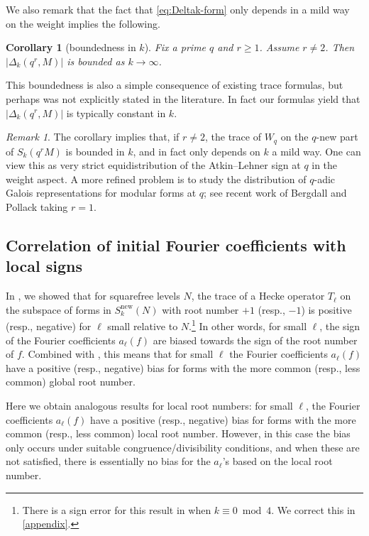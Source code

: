 \documentclass[11pt]{amsart}
\newcommand{\new}{\mathrm{new}}
\renewcommand{\mod}{\bmod}
\numberwithin{lem}{section}
\newtheorem{cor}[lem]{Corollary}
\theoremstyle{remark}
\newtheorem{rem}[lem]{Remark}
\theoremstyle{definition}
\numberwithin{equation}{section}
\begin{document}
We also remark that the fact that \eqref{eq:Deltak-form} only depends in a mild way on the weight implies the following.

\begin{cor} [boundedness in $k$] Fix a prime $q$ and $r \ge 1$.  Assume $r \ne 2$.  Then $\lvert \Delta_k(q^r, M) \rvert$ is bounded as $k \to \infty$.
\end{cor}

This boundedness is also a simple consequence of existing trace formulas, but perhaps was not explicitly stated in the literature.  In fact our formulas yield that $\lvert \Delta_k(q^r, M) \rvert$ is typically constant in $k$.

\begin{rem} The corollary implies that, if $r \ne 2$, the trace of $W_q$ on the $q$-new part of $S_k(q^r M)$ is bounded in $k$, and in fact only depends on $k$ a mild way.  One can view this as very strict equidistribution of the Atkin--Lehner sign at $q$ in the weight aspect.  A more refined problem is to study the distribution of $q$-adic Galois representations for modular forms at $q$; see recent work of Bergdall and Pollack \cite{BP} taking $r=1$. 
\end{rem}

\subsection{Correlation of initial Fourier coefficients with local signs}

In \cite{me:pharis}, we showed that for squarefree levels $N$, the trace of a Hecke operator $T_\ell$ on the subspace of forms in $S_k^\new(N)$ with root number $+1$ (resp., $-1$) is positive (resp., negative) for $\ell$ small relative to $N$.\footnote{There is a sign error for this result in \cite{me:pharis} when $k \equiv 0 \mod 4$.  We correct this in \cref{appendix}.} In other words, for small $\ell$, the sign of the Fourier coefficients $a_\ell(f)$ are biased towards the sign of the root number of $f$.  Combined with \cite{me:refdim}, this means that for small $\ell$ the Fourier coefficients $a_\ell(f)$ have a positive (resp., negative) bias for forms with the more common (resp., less common) global root number.

Here we obtain analogous results for local root numbers: for small $\ell$, the
Fourier coefficients $a_\ell(f)$ have a positive (resp., negative) bias for forms with the more common (resp., less common) local root number.  However, in this case the bias only occurs under suitable congruence/divisibility conditions, and when these are not satisfied, there is essentially no bias for the $a_\ell$'s based on the local root number.
\end{document}
